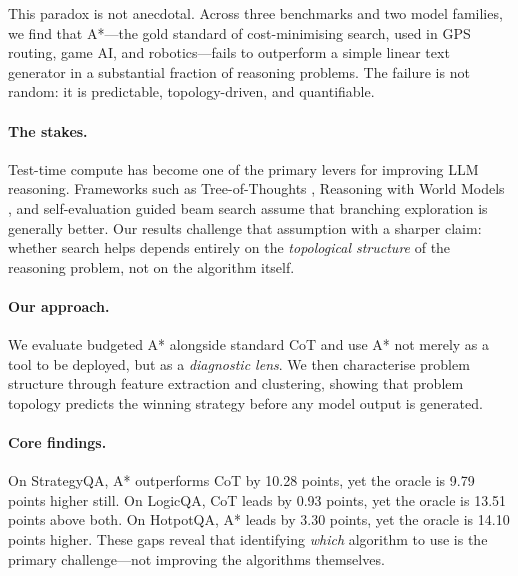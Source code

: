 \documentclass[11pt]{article}
\begin{document}
This paradox is not anecdotal. Across three benchmarks and two model families, we find that A*—the gold standard of cost-minimising search, used in GPS routing, game AI, and robotics—fails to outperform a simple linear text generator in a substantial fraction of reasoning problems. The failure is not random: it is predictable, topology-driven, and quantifiable.

\paragraph{The stakes.}
Test-time compute has become one of the primary levers for improving LLM reasoning. Frameworks such as Tree-of-Thoughts \citep{yao2024tree}, Reasoning with World Models \citep{hao2023reasoning}, and self-evaluation guided beam search \citep{xie2024self} assume that branching exploration is generally better. Our results challenge that assumption with a sharper claim: whether search helps depends entirely on the \emph{topological structure} of the reasoning problem, not on the algorithm itself.

\paragraph{Our approach.}
We evaluate budgeted A* alongside standard CoT and use A* not merely as a tool to be deployed, but as a \emph{diagnostic lens}. We then characterise problem structure through feature extraction and clustering, showing that problem topology predicts the winning strategy before any model output is generated.

\paragraph{Core findings.}
On StrategyQA, A* outperforms CoT by 10.28 points, yet the oracle is 9.79 points higher still. On LogicQA, CoT leads by 0.93 points, yet the oracle is 13.51 points above both. On HotpotQA, A* leads by 3.30 points, yet the oracle is 14.10 points higher. These gaps reveal that identifying \emph{which} algorithm to use is the primary challenge—not improving the algorithms themselves.
\end{document}
